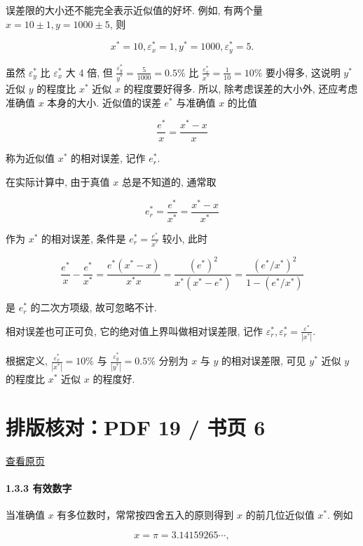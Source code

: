 \documentclass[
  10pt,
  a4paper,
]{article}
\begin{document}
误差限的大小还不能完全表示近似值的好坏. 例如, 有两个量
\(x = 10 \pm 1, y = 1000 \pm 5\), 则

\[
x^* = 10, \varepsilon_x^* = 1, y^* = 1000, \varepsilon_y^* = 5.
\]

虽然 \(\varepsilon_y^*\) 比 \(\varepsilon_x^*\) 大 4 倍, 但
\(\frac{\varepsilon_y^*}{y^*} = \frac{5}{1000} = 0.5\%\) 比
\(\frac{\varepsilon_x^*}{x^*} = \frac{1}{10} = 10\%\) 要小得多, 这说明
\(y^*\) 近似 \(y\) 的程度比 \(x^*\) 近似 \(x\) 的程度要好得多. 所以,
除考虑误差的大小外, 还应考虑准确值 \(x\) 本身的大小. 近似值的误差
\(e^*\) 与准确值 \(x\) 的比值

\[
\frac{e^*}{x} = \frac{x^* - x}{x}
\]

称为近似值 \(x^*\) 的相对误差, 记作 \(e_r^*\).

在实际计算中, 由于真值 \(x\) 总是不知道的, 通常取

\[
e_r^* = \frac{e^*}{x^*} = \frac{x^* - x}{x^*}
\]

作为 \(x^*\) 的相对误差, 条件是 \(e_r^* = \frac{e^*}{x^*}\) 较小, 此时

\[
\frac{e^*}{x} - \frac{e^*}{x^*} = \frac{e^* (x^* - x)}{x^* x} = \frac{(e^*)^2}{x^* (x^* - e^*)} = \frac{(e^* / x^*)^2}{1 - (e^* / x^*)}
\]

是 \(e_r^*\) 的二次方项级, 故可忽略不计.

相对误差也可正可负, 它的绝对值上界叫做相对误差限, 记作
\(\varepsilon_r^*, \varepsilon_r^* = \frac{\varepsilon^*}{|x^*|}\).

根据定义, \(\frac{\varepsilon_x^*}{|x^*|} = 10\%\) 与
\(\frac{\varepsilon_y^*}{|y^*|} = 0.5\%\) 分别为 \(x\) 与 \(y\)
的相对误差限, 可见 \(y^*\) 近似 \(y\) 的程度比 \(x^*\) 近似 \(x\)
的程度好.

\newpage

\section{排版核对：PDF 19 / 书页
6}\label{ux6392ux7248ux6838ux5bf9pdf-19-ux4e66ux9875-6}

\href{../../../source-images/pdf-019.jpeg}{查看原页}

\paragraph{1.3.3 有效数字}\label{ux6709ux6548ux6570ux5b57}

当准确值 \(x\) 有多位数时，常常按四舍五入的原则得到 \(x\) 的前几位近似值
\(x^*\). 例如

\[
x = \pi = 3.14159265\cdots,
\]
\end{document}
